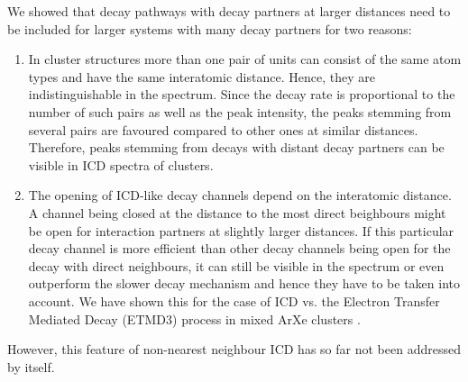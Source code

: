 We showed that decay pathways with decay partners at larger distances need to
be included for larger systems with many decay partners for two reasons:
\begin{enumerate}
 \item In cluster structures more than one pair of units can consist of
       the same atom types and have the same interatomic distance. Hence,
       they are indistinguishable in the spectrum. Since the decay rate
       is proportional to the number of such pairs as well as the peak
       intensity, the peaks stemming from several pairs are favoured
       compared to other ones at similar distances. Therefore, peaks
       stemming from decays with distant decay partners can be visible
       in ICD spectra of clusters. \cite{Fasshauer14_1}
 \item The opening of ICD-like decay channels depend on the interatomic
       distance. A channel being closed at the distance to the most direct
       beighbours might be open for interaction partners at slightly
       larger distances. If this particular decay channel is more efficient
       than other decay channels being open for the decay with direct
       neighbours, it can still be visible in the spectrum or even
       outperform the slower decay mechanism and hence they have to be
       taken into account. We have shown this for the case of ICD vs.
       the Electron Transfer Mediated Decay (ETMD3) process in mixed ArXe
       clusters \cite{Fasshauer13,Fasshauer15_2}.
\end{enumerate}
However, this feature of non-nearest neighbour ICD
has so far not been addressed by itself.

